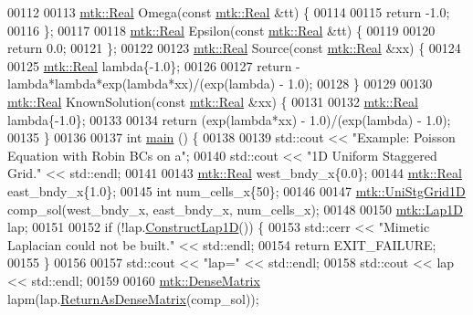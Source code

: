 \begin{DoxyCode}
00112 
00113 \hyperlink{group__c01-roots_gac080bbbf5cbb5502c9f00405f894857d}{mtk::Real} Omega(\textcolor{keyword}{const} \hyperlink{group__c01-roots_gac080bbbf5cbb5502c9f00405f894857d}{mtk::Real} &tt) \{
00114 
00115   \textcolor{keywordflow}{return} -1.0;
00116 \};
00117 
00118 \hyperlink{group__c01-roots_gac080bbbf5cbb5502c9f00405f894857d}{mtk::Real} Epsilon(\textcolor{keyword}{const} \hyperlink{group__c01-roots_gac080bbbf5cbb5502c9f00405f894857d}{mtk::Real} &tt) \{
00119 
00120   \textcolor{keywordflow}{return} 0.0;
00121 \};
00122 
00123 \hyperlink{group__c01-roots_gac080bbbf5cbb5502c9f00405f894857d}{mtk::Real} Source(\textcolor{keyword}{const} \hyperlink{group__c01-roots_gac080bbbf5cbb5502c9f00405f894857d}{mtk::Real} &xx) \{
00124 
00125   \hyperlink{group__c01-roots_gac080bbbf5cbb5502c9f00405f894857d}{mtk::Real} lambda\{-1.0\};
00126 
00127   \textcolor{keywordflow}{return} -lambda*lambda*exp(lambda*xx)/(exp(lambda) - 1.0);
00128 \}
00129 
00130 \hyperlink{group__c01-roots_gac080bbbf5cbb5502c9f00405f894857d}{mtk::Real} KnownSolution(\textcolor{keyword}{const} \hyperlink{group__c01-roots_gac080bbbf5cbb5502c9f00405f894857d}{mtk::Real} &xx) \{
00131 
00132   \hyperlink{group__c01-roots_gac080bbbf5cbb5502c9f00405f894857d}{mtk::Real} lambda\{-1.0\};
00133 
00134   \textcolor{keywordflow}{return} (exp(lambda*xx) - 1.0)/(exp(lambda) - 1.0);
00135 \}
00136 
00137 \textcolor{keywordtype}{int} \hyperlink{poisson__1d_8cc_ae66f6b31b5ad750f1fe042a706a4e3d4}{main} () \{
00138 
00139   std::cout << \textcolor{stringliteral}{"Example: Poisson Equation with Robin BCs on a"};
00140   std::cout << \textcolor{stringliteral}{"1D Uniform Staggered Grid."} << std::endl;
00141 
00143   \hyperlink{group__c01-roots_gac080bbbf5cbb5502c9f00405f894857d}{mtk::Real} west\_bndy\_x\{0.0\};
00144   \hyperlink{group__c01-roots_gac080bbbf5cbb5502c9f00405f894857d}{mtk::Real} east\_bndy\_x\{1.0\};
00145   \textcolor{keywordtype}{int} num\_cells\_x\{50\};
00146 
00147   \hyperlink{classmtk_1_1UniStgGrid1D}{mtk::UniStgGrid1D} comp\_sol(west\_bndy\_x, east\_bndy\_x, num\_cells\_x);
00148 
00150   \hyperlink{classmtk_1_1Lap1D}{mtk::Lap1D} lap;
00151 
00152   \textcolor{keywordflow}{if} (!lap.\hyperlink{classmtk_1_1Lap1D_a685dcba88c08cf5b7b6c2aa4669a472c}{ConstructLap1D}()) \{
00153     std::cerr << \textcolor{stringliteral}{"Mimetic Laplacian could not be built."} << std::endl;
00154     \textcolor{keywordflow}{return} EXIT\_FAILURE;
00155   \}
00156 
00157   std::cout << \textcolor{stringliteral}{"lap="} << std::endl;
00158   std::cout << lap << std::endl;
00159 
00160   \hyperlink{classmtk_1_1DenseMatrix}{mtk::DenseMatrix} lapm(lap.\hyperlink{classmtk_1_1Lap1D_aaea34a17b0879e05eb4109645a2ba8f4}{ReturnAsDenseMatrix}(comp\_sol));

\end{DoxyCode}
